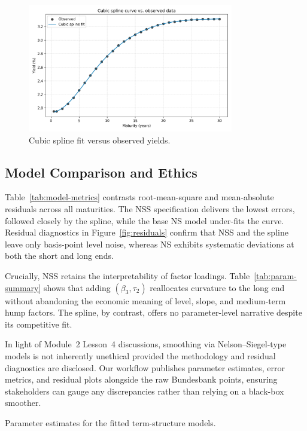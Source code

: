 \documentclass[12pt]{article}
\begin{document}
\begin{figure}[htbp]
  \centering
  \includegraphics[width=0.8\textwidth]{../data/output/figure_spline_fit.png}
  \caption{Cubic spline fit versus observed yields.}
  \label{fig:spline-fit}
\end{figure}

\subsection{Model Comparison and Ethics}
\begin{spacing}{1.15}
Table~\ref{tab:model-metrics} contrasts root-mean-square and mean-absolute residuals across all maturities. The NSS specification delivers the lowest errors, followed closely by the spline, while the base NS model under-fits the curve. Residual diagnostics in Figure~\ref{fig:residuals} confirm that NSS and the spline leave only basis-point level noise, whereas NS exhibits systematic deviations at both the short and long ends.

Crucially, NSS retains the interpretability of factor loadings. Table~\ref{tab:param-summary} shows that adding $(\beta_3, \tau_2)$ reallocates curvature to the long end without abandoning the economic meaning of level, slope, and medium-term hump factors. The spline, by contrast, offers no parameter-level narrative despite its competitive fit.

In light of Module~2 Lesson~4 discussions, smoothing via Nelson--Siegel-type models is not inherently unethical provided the methodology and residual diagnostics are disclosed. Our workflow publishes parameter estimates, error metrics, and residual plots alongside the raw Bundesbank points, ensuring stakeholders can gauge any discrepancies rather than relying on a black-box smoother.
\end{spacing}

\begin{table}[htbp]
  \centering
  \caption{Parameter estimates for the fitted term-structure models.}
  \label{tab:param-summary}
  
\end{table}
\end{document}
